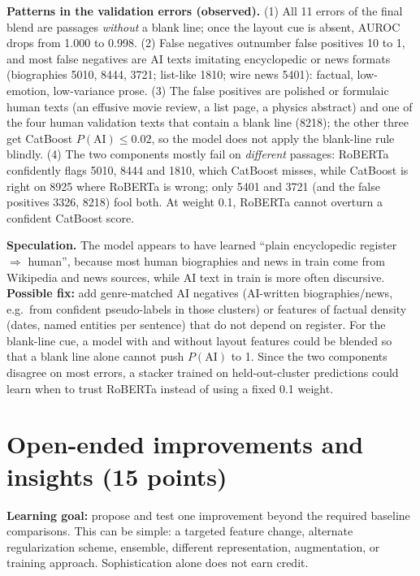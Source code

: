 \documentclass[11pt,letterpaper]{article}
\begin{document}
\textbf{Patterns in the validation errors (observed).} (1) All 11 errors of the final blend are passages \emph{without} a blank line; once the layout cue is absent, AUROC drops from 1.000 to 0.998. (2) False negatives outnumber false positives 10 to 1, and most false negatives are AI texts imitating encyclopedic or news formats (biographies 5010, 8444, 3721; list-like 1810; wire news 5401): factual, low-emotion, low-variance prose. (3) The false positives are polished or formulaic human texts (an effusive movie review, a list page, a physics abstract) and one of the four human validation texts that contain a blank line (8218); the other three get CatBoost $P(\text{AI})\le 0.02$, so the model does not apply the blank-line rule blindly. (4) The two components mostly fail on \emph{different} passages: RoBERTa confidently flags 5010, 8444 and 1810, which CatBoost misses, while CatBoost is right on 8925 where RoBERTa is wrong; only 5401 and 3721 (and the false positives 3326, 8218) fool both. At weight 0.1, RoBERTa cannot overturn a confident CatBoost score.

\textbf{Speculation.} The model appears to have learned ``plain encyclopedic register $\Rightarrow$ human'', because most human biographies and news in train come from Wikipedia and news sources, while AI text in train is more often discursive. \textbf{Possible fix:} add genre-matched AI negatives (AI-written biographies/news, e.g.\ from confident pseudo-labels in those clusters) or features of factual density (dates, named entities per sentence) that do not depend on register. For the blank-line cue, a model with and without layout features could be blended so that a blank line alone cannot push $P(\text{AI})$ to 1. Since the two components disagree on most errors, a stacker trained on held-out-cluster predictions could learn when to trust RoBERTa instead of using a fixed 0.1 weight.

\newpage
\section{Open-ended improvements and insights (15 points)}
\textbf{Learning goal:} propose and test one improvement beyond the required baseline comparisons. This can be simple: a targeted feature change, alternate regularization scheme, ensemble, different representation, augmentation, or training approach. Sophistication alone does not earn credit.
\end{document}
